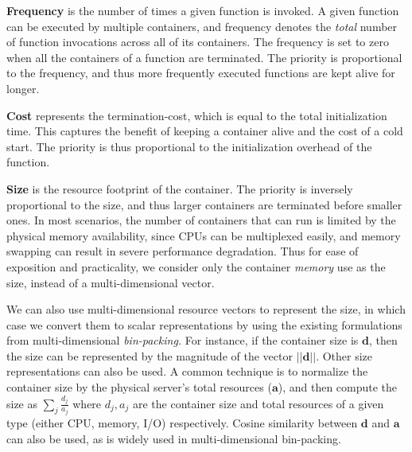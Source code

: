 \noindent \textbf{Frequency} is the number of times a given function is invoked.
A given function can be executed by multiple containers, and frequency denotes the \emph{total} number of function invocations across all of its containers. 
The frequency is set to zero when all the containers of a function are terminated.
The priority is proportional to the frequency, and thus more frequently executed functions are kept alive for longer. 
%
%


\noindent \textbf{Cost} represents the termination-cost, which is equal to the total initialization time. 
This captures the benefit of keeping a container alive and the cost of a cold start. 
The priority is thus proportional to the initialization overhead of the function. 



\noindent \textbf{Size} is the resource footprint of the container. 
The priority is inversely proportional to the size, and thus larger containers are terminated before smaller ones. 
In most scenarios, the number of containers that can run is limited by the physical memory availability, since CPUs can be multiplexed easily, and memory swapping can result in severe performance degradation.
Thus for ease of exposition and practicality, we consider only the container \emph{memory} use as the size, instead of a multi-dimensional vector. 


We can also use multi-dimensional resource vectors to represent the size, in which case we convert them to scalar representations by using the existing formulations from multi-dimensional \emph{bin-packing.}
For instance, if the container size is $\mathbf{d}$, then the size can be represented by the magnitude of the vector $||\mathbf{d}||$.
Other size representations can also be used.
A common technique is to normalize the container size by the physical server's total resources ($\mathbf{a}$), and then compute the size as $\sum_j \frac{d_j}{a_j}$ where $d_j, a_j$ are the container size and total resources of a given type (either CPU, memory, I/O) respectively.
Cosine similarity between $\mathbf{d}$ and $\mathbf{a}$ can also be used, as is widely used in multi-dimensional bin-packing.  


